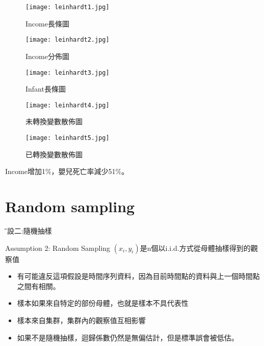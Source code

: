 \documentclass[xcolor=dvipsnames]{beamer}
\begin{document}
\begin{frame}
\begin{figure}
\texttt{[image: leinhardt1.jpg]}
\caption{Income長條圖}
\end{figure}
\end{frame}

\begin{frame}
\begin{figure}
\texttt{[image: leinhardt2.jpg]}
\caption{Income分佈圖}
\end{figure}
\end{frame}
\begin{frame}
\begin{figure}
\texttt{[image: leinhardt3.jpg]}
\caption{Infant長條圖}
\end{figure}
\end{frame}
\begin{frame}
\begin{figure}
\texttt{[image: leinhardt4.jpg]}
\caption{未轉換變數散佈圖}
\end{figure}
\end{frame}
\begin{frame}
\begin{figure}
\texttt{[image: leinhardt5.jpg]}
\caption{已轉換變數散佈圖}
\end{figure}
Income增加1\%，嬰兒死亡率減少51\%。
\end{frame}
\section{Random sampling}
\begin{frame}{\H 假設二:隨機抽樣}
\begin{block}{Assumption 2: Random Sampling}
$ (x_{i},y_{i}) $是n個以i.i.d.方式從母體抽樣得到的觀察值
\end{block}
\begin{itemize}
\item 有可能違反這項假設是時間序列資料，因為目前時間點的資料與上一個時間點之間有相關。
\item 樣本如果來自特定的部份母體，也就是樣本不具代表性
\item 樣本來自集群，集群內的觀察值互相影響
\item 如果不是隨機抽樣，迴歸係數仍然是無偏估計，但是標準誤會被低估。
\end{itemize}
\end{frame}
\end{document}
